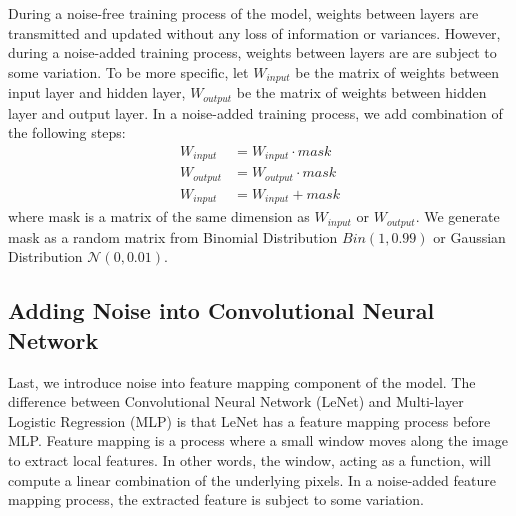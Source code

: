 During a noise-free training process of the model, weights between layers
are transmitted and updated without any loss of information or variances.
However, during a noise-added training process, weights between layers are
are subject to some variation.
To be more specific, let $W_{input}$ be the matrix of weights between
input layer and hidden layer, $W_{output}$ be the matrix of weights
between hidden layer and output layer. In a noise-added training process,
we add combination of the following steps:
\begin{align*}
W_{input} & = W_{input} \cdot mask \\
W_{output} & = W_{output} \cdot mask \\
W_{input} & = W_{input} + mask
\end{align*}
where mask is a matrix of the same dimension as $W_{input}$ or $W_{output}$.
We generate mask as a random matrix from Binomial Distribution
$Bin(1,0.99)$ or Gaussian Distribution $\mathcal{N}(0, 0.01)$.

\subsection{Adding Noise into Convolutional Neural Network}
Last, we introduce noise into feature mapping component of
the model. The difference between Convolutional Neural Network (LeNet) and
Multi-layer Logistic Regression (MLP) is that LeNet has a feature mapping
process before MLP. Feature mapping is a process where a small window moves along the image to extract local features. In other words, the window, acting as
a function, will compute a linear combination of the underlying pixels.
In a noise-added feature mapping process, the extracted feature is subject
to some variation.

